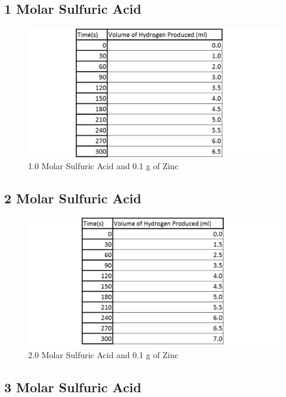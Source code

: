 	\subsection{1 Molar Sulfuric Acid}

\begin{figure}[H]
    \includegraphics[width=\textwidth]{./Experiment/Images/5Solubility/1Molar.pdf}
    \caption{1.0 Molar Sulfuric Acid and 0.1 g of Zinc} \label{fig:1MolarSolubilityRawData}
\end{figure}

	\subsection{2 Molar Sulfuric Acid}

\begin{figure}[H]
    \includegraphics[width=\textwidth]{./Experiment/Images/5Solubility/2Molar.pdf}
    \caption{2.0 Molar Sulfuric Acid and 0.1 g of Zinc} \label{fig:2MolarSolubilityRawData}
\end{figure}

	\subsection{3 Molar Sulfuric Acid}

